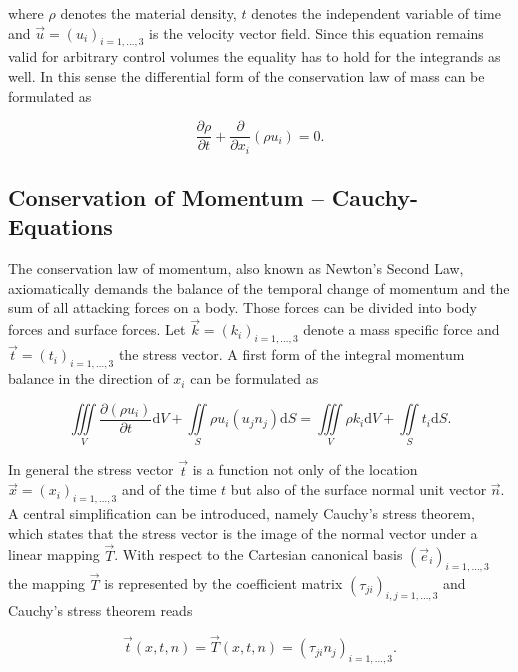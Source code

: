     where \( \rho \) denotes the material density, \(t \) denotes the independent variable of time and \(\vec{u} = \left( u_i \right)_{i=1,\dots,3}\) is the velocity vector field. Since this equation remains valid for arbitrary control volumes the equality has to hold for the integrands as well. In this sense the differential form of the conservation law of mass can be formulated as

    \begin{equation}
      \label{eq:contifull}
      \frac{\partial \rho}{\partial t} + \frac{\partial}{\partial x_i}\left( \rho u_i \right)
      = 0.
    \end{equation}


    \subsection{Conservation of Momentum -- Cauchy-Equations}

    The conservation law of momentum, also known as Newton's Second Law, axiomatically demands the balance of the temporal change of momentum and the sum of all attacking forces on a body. Those forces can be divided into body forces and surface forces. Let \(\vec{k} = \left( k_i \right)_{i=1,\dots,3}\) denote a mass specific force and \(\vec{t} = \left(t_i\right)_{i=1,\dots,3}\) the stress vector. A first form of the integral momentum balance in the direction of \(x_i\) can be formulated as

    \begin{displaymath}
      \iiint\limits_V \frac{\partial \left(\rho u_i \right)}{\partial t} \mathrm{d}V + \iint\limits_S \rho u_i \left( u_j n_j \right) \mathrm{d}S = \iiint\limits_V \rho k_i \mathrm{d}V + \iint\limits_S t_i \mathrm{d}S.
    \end{displaymath}

    In general the stress vector \(\vec{t}\) is a function not only of the location \(\vec{x} = \left( x_i \right)_{i = 1,\dots,3}\) and of the time \(t\) but also of the surface normal unit vector \(\vec{n}\). A central simplification can be introduced, namely Cauchy's stress theorem, which states that the stress vector is the image of the normal vector under a linear mapping \(\vec{T}\). With respect to the Cartesian canonical basis \(\left(\vec{e}_i \right)_{i = 1, \dots, 3}\) the mapping \(\vec{T}\) is represented by the coefficient matrix \( \left(\tau_{ji}\right)_{i,j = 1,\dots,3}\) and Cauchy's stress theorem reads

    \begin{displaymath}
      \vec{t}\left(x,t,n\right) = \vec{T}(x,t,n) = \left(\tau_{ji} n_j\right)_{i = 1, \dots, 3}.
    \end{displaymath}

